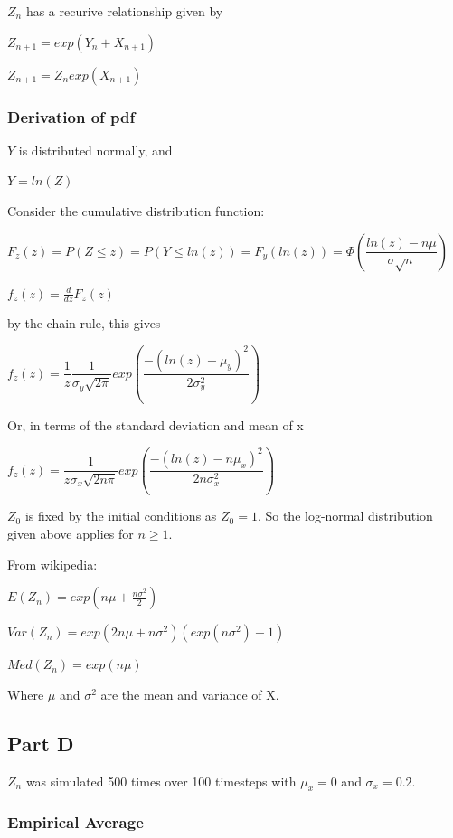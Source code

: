 \documentclass{article}
\begin{document}
$Z_n$ has a recurive relationship given by

$Z_{n+1} = exp(Y_n + X_{n+1})$

$Z_{n+1} = Z_n exp(X_{n+1})$

\subsubsection{Derivation of pdf}

$Y$ is distributed normally, and

$Y = ln(Z)$

\bigskip

Consider the cumulative distribution function:


$F_z(z) = P(Z \leq z) = P(Y \leq ln(z)) = F_y(ln(z)) = \Phi(\dfrac{ln(z) - n\mu}{\sigma \sqrt{n}})$

$f_z(z) = \frac{d}{dz}F_z(z)$

by the chain rule, this gives

$f_z(z) = \dfrac{1}{z} \dfrac{1}{\sigma_y \sqrt{2\pi}}exp(\dfrac{-(ln(z)-\mu_y)^2}{2\sigma_y^2})$

Or, in terms of the standard deviation and mean of x

$f_z(z) = \dfrac{1}{z\sigma_x \sqrt{2n\pi}}exp(\dfrac{-(ln(z)-n\mu_x)^2}{2n\sigma_x^2})$

$Z_0$ is fixed by the initial conditions as $Z_0=1$. So the log-normal distribution given above applies for $n \geq 1$.

\bigskip

From wikipedia: 

$E(Z_n) = exp(n\mu + \frac{n\sigma^2}{2})$

$Var(Z_n) = exp(2n \mu + n\sigma^2)(exp(n\sigma^2)-1)$

$Med(Z_n) = exp(n\mu)$

Where $\mu$ and $\sigma^2$ are the mean and variance of X.

\subsection{Part D}
$Z_n$ was simulated 500 times over 100 timesteps with $\mu_x=0$ and $\sigma_x=0.2$.

\subsubsection{Empirical Average}
\end{document}
